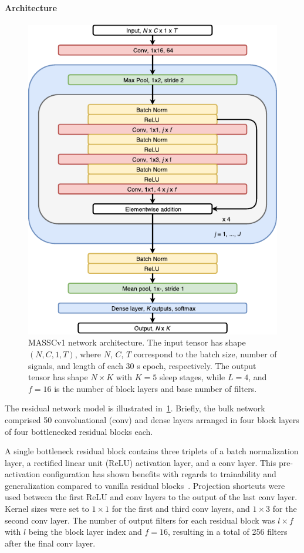 \paragraph{Architecture}
\begin{figure}[tb]
    \centering
    \includegraphics[height=0.5\textheight]{figures/ResNet_EMBC_compressed.pdf}
    \caption[MASSCv1 network architecture]{MASSCv1 network architecture. The input tensor has shape $(N, C, 1, T)$, where $N$, $C$, $T$ correspond to the batch size, number of signals, and length of each 30 s epoch, respectively. The output tensor has shape $N\times K$ with $K=5$ sleep stages, while $L=4$, and $f=16$ is the number of block layers and base number of filters.}
    \label{fig:network}
\end{figure}
The residual network model is illustrated in~\cref{fig:network}. 
Briefly, the bulk network comprised 50 convoluational (conv) and dense layers arranged in four block layers of four bottlenecked residual blocks each. 

A single bottleneck residual block contains three triplets of a batch normalization layer, a rectified linear unit (ReLU) activation layer, and a conv layer. 
This pre-activation configuration has shown benefits with regards to trainability and generalization compared to vanilla residual blocks~\cite{He2016b}.
Projection shortcuts were used between the first ReLU and conv layers to the output of the last conv layer.
Kernel sizes were set to $1\times1$ for the first and third conv layers, and $1\times3$ for the second conv layer.
The number of output filters for each residual block was $l\times f$ with $l$ being the block layer index and $f=16$, resulting in a total of 256 filters after the final conv layer.


